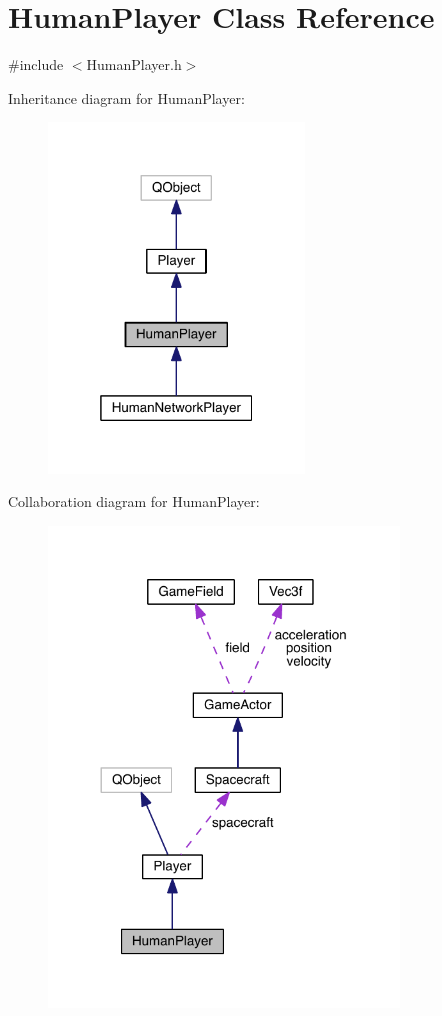 \hypertarget{class_human_player}{\section{Human\+Player Class Reference}
\label{class_human_player}
}


{\ttfamily \#include $<$Human\+Player.\+h$>$}



Inheritance diagram for Human\+Player\+:\nopagebreak
\begin{figure}[H]
\begin{center}
\leavevmode
\includegraphics[width=193pt]{class_human_player__inherit__graph}
\end{center}
\end{figure}


Collaboration diagram for Human\+Player\+:\nopagebreak
\begin{figure}[H]
\begin{center}
\leavevmode
\includegraphics[width=264pt]{class_human_player__coll__graph}
\end{center}
\end{figure}
